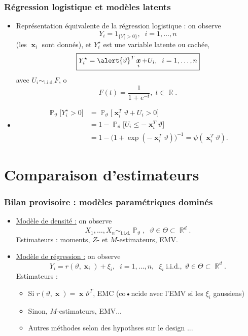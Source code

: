 \documentclass{beamer}
\DeclareMathOperator{\R}{{\mathbb R}}
\DeclareMathOperator{\PP}{{\mathbb P}}
\DeclareMathOperator{\bx}{\boldsymbol{x}}
\begin{document}
\begin{frame}
\frametitle{Régression logistique et modèles latents}
\begin{itemize}
\item \alert{Représentation équivalente de la régression logistique} : on observe
$$\boxed{Y_i = 1_{\big\{Y_i^\star >0\big\}},\;\;i=1,\ldots,n}$$
(les $\bx_i$ sont donnés), et $Y_i^\star$ est une  \alert{variable latente} ou cachée,
$$\boxed{Y^\star_i =\alert{\vartheta}^T \bx_i + U_i,\;\;i=1,\ldots, n}$$
avec \alert{$U_i\sim_{\text{i.i.d.}} F$}, o
$$F(t) = \frac{1}{1+e^{-t}},\;t \in \R.$$
\item
\begin{align*}
\PP_\vartheta\big[Y_i^\star>0] & = \PP_\vartheta\big[\bx_i^T\vartheta + U_i >0\big] \\
& = 1-\PP_\vartheta\big[U_i \leq -\bx_i^T\vartheta\big] \\
& = 1-\big(1+\exp(-\bx_i^T\vartheta)\big)^{-1} =  \psi(\bx_i^T\vartheta).
\end{align*}
\end{itemize}
\end{frame}



\section{Comparaison d'estimateurs}

\begin{frame}
\frametitle{Bilan provisoire : modèles paramétriques dominés}
\begin{itemize}
\item \underline{\alert{Modèle de densité :}} on observe
$$X_1,\ldots,X_n \sim_{\text{i.i.d.}} \PP_\vartheta,\;\;\vartheta \in \Theta \subset \R^d.$$
{\color{blue}Estimateurs :} moments, $Z$- et $M$-estimateurs, \alert{EMV}.
\item\underline{\alert{Modèle de régression :}} on observe
$$Y_i = r(\vartheta, \bx_i)+\xi_i,\;\;i=1,\ldots, n,\;\;\xi_i\;\text{i.i.d.},\;\vartheta \in \Theta \subset \R^d.$$
{\color{blue} Estimateurs :}
\begin{itemize}
\item Si $r(\vartheta, \bx) = \bx \vartheta^T$, EMC (co•ncide avec l'\alert{EMV} si les $\xi_i$ gaussiens)
\item Sinon, $M$-estimateurs, \alert{EMV}...
\item Autres méthodes selon des \alert{hypothses} sur le \og design \fg{}...
\end{itemize}
\end{itemize}
\end{frame}
\end{document}
